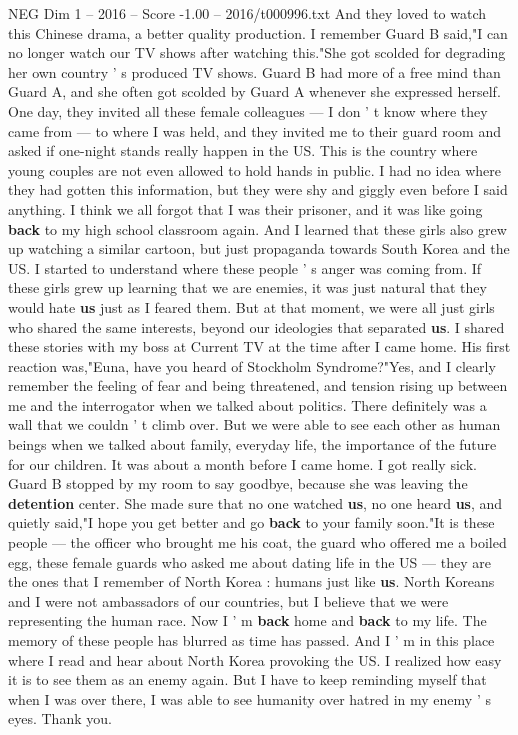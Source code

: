 \begin{textsample}{NEG Dim 1 – 2016 – Score -1.00 – 2016/t000996.txt}
And they loved to watch this Chinese drama, a better quality production.
I remember Guard B said,"I can no longer watch our TV shows after watching this."She got scolded for degrading her own country ' s produced TV shows.
Guard B had more of a free mind than Guard A, and she often got scolded by Guard A whenever she expressed herself.
One day, they invited all these female colleagues — I don ' t know where they came from — to where I was held, and they invited me to their guard room and asked if one-night stands really happen in the US.
This is the country where young couples are not even allowed to hold hands in public.
I had no idea where they had gotten this information, but they were shy and giggly even before I said anything.
I think we all forgot that I was their prisoner, and it was like going \textbf{back} to my high school classroom again.
And I learned that these girls also grew up watching a similar cartoon, but just propaganda towards South Korea and the US.
I started to understand where these people ' s anger was coming from.
If these girls grew up learning that we are enemies, it was just natural that they would hate \textbf{us} just as I feared them.
But at that moment, we were all just girls who shared the same interests, beyond our ideologies that separated \textbf{us}.
I shared these stories with my boss at Current TV at the time after I came home.
His first reaction was,"Euna, have you heard of Stockholm Syndrome?"Yes, and I clearly remember the feeling of fear and being threatened, and tension rising up between me and the interrogator when we talked about politics.
There definitely was a wall that we couldn ' t climb over.
But we were able to see each other as human beings when we talked about family, everyday life, the importance of the future for our children.
It was about a month before I came home.
I got really sick.
Guard B stopped by my room to say goodbye, because she was leaving the \textbf{detention} center.
She made sure that no one watched \textbf{us}, no one heard \textbf{us}, and quietly said,"I hope you get better and go \textbf{back} to your family soon."It is these people — the officer who brought me his coat, the guard who offered me a boiled egg, these female guards who asked me about dating life in the US — they are the ones that I remember of North Korea : humans just like \textbf{us}.
North Koreans and I were not ambassadors of our countries, but I believe that we were representing the human race.
Now I ' m \textbf{back} home and \textbf{back} to my life.
The memory of these people has blurred as time has passed.
And I ' m in this place where I read and hear about North Korea provoking the US.
I realized how easy it is to see them as an enemy again.
But I have to keep reminding myself that when I was over there, I was able to see humanity over hatred in my enemy ' s eyes.
Thank you.

\end{textsample}
